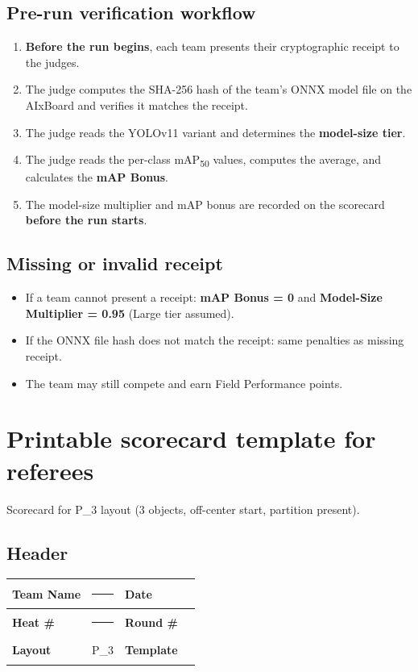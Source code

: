 \documentclass[a4]{article}
\begin{document}
\subsection*{Pre-run verification workflow}

\begin{enumerate}
    \item \textbf{Before the run begins}, each team presents their cryptographic receipt to the judges.
    \item The judge computes the SHA-256 hash of the team's ONNX model file on the AIxBoard and verifies it matches the receipt.
    \item The judge reads the YOLOv11 variant and determines the \textbf{model-size tier}.
    \item The judge reads the per-class mAP\textsubscript{50} values, computes the average, and calculates the \textbf{mAP Bonus}.
    \item The model-size multiplier and mAP bonus are recorded on the scorecard \textbf{before the run starts}.
\end{enumerate}

\subsection*{Missing or invalid receipt}

\begin{itemize}
    \item If a team cannot present a receipt: \textbf{mAP Bonus = 0} and \textbf{Model-Size Multiplier = 0.95} (Large tier assumed).
    \item If the ONNX file hash does not match the receipt: same penalties as missing receipt.
    \item The team may still compete and earn Field Performance points.
\end{itemize}

\section*{Printable scorecard template for referees} 
Scorecard for P\_3 layout (3 objects, off-center start, partition present).

\subsection*{Header}

\begin{table}[H]
\centering
\begin{tabular}{|l|p{5cm}|l|p{3cm}|}
\hline
\textbf{Team Name} & \rule{5cm}{0.4pt} & \textbf{Date} & \rule{3cm}{0.4pt} \\
\hline
\textbf{Heat \#} & \rule{5cm}{0.4pt} & \textbf{Round \#} & \rule{3cm}{0.4pt} \\
\hline
\textbf{Layout} & P\_3 & \textbf{Template} & \rule{3cm}{0.4pt} \\
\hline
\end{tabular}
\end{table}
\end{document}
